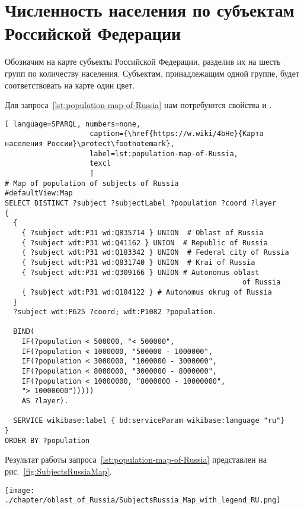 \section{Численность населения по субъектам Российской Федерации}

Обозначим на карте субъекты Российской Федерации, 
разделив их на шесть групп по количеству населения. 
Субъектам, принадлежащим одной группе, будет соответствовать на карте один цвет.

Для запроса~\ref{lst:population-map-of-Russia} нам потребуются свойства  
и .

\begin{lstlisting}[ language=SPARQL, numbers=none,
                    caption={\href{https://w.wiki/4bHe}{Карта населения России}\protect\footnotemark},
                    label=lst:population-map-of-Russia,
                    texcl 
                    ]
# Map of population of subjects of Russia
#defaultView:Map
SELECT DISTINCT ?subject ?subjectLabel ?population ?coord ?layer
{
  {
    { ?subject wdt:P31 wd:Q835714 } UNION  # Oblast of Russia
    { ?subject wdt:P31 wd:Q41162 } UNION  # Republic of Russia
    { ?subject wdt:P31 wd:Q183342 } UNION  # Federal city of Russia
    { ?subject wdt:P31 wd:Q831740 } UNION  # Krai of Russia
    { ?subject wdt:P31 wd:Q309166 } UNION # Autonomus oblast 
                                                        of Russia
    { ?subject wdt:P31 wd:Q184122 } # Autonomus okrug of Russia
  }   
  ?subject wdt:P625 ?coord; wdt:P1082 ?population.
  
  BIND(
    IF(?population < 500000, "< 500000",
    IF(?population < 1000000, "500000 - 1000000",
    IF(?population < 3000000, "1000000 - 3000000",
    IF(?population < 8000000, "3000000 - 8000000",
    IF(?population < 10000000, "8000000 - 10000000",
    "> 10000000")))))
    AS ?layer).
  
  SERVICE wikibase:label { bd:serviceParam wikibase:language "ru"}
}
ORDER BY ?population
\end{lstlisting}%

Результат работы запроса~\ref{lst:population-map-of-Russia} представлен на рис.~\ref{fig:SubjectsRussiaMap}.

\begin{fullwidth}
\begin{figure*}[h]
	\texttt{[image: ./chapter/oblast\_of\_Russia/SubjectsRussia\_Map\_with\_legend\_RU.png]}
	\caption[Карта численности населения по субъектам России, 2021 год.]{Карта численности населения по субъектам России, 2021 год. Субъекты разделёны на шесть групп по количеству населения и отмечены разными цветами в зависимости от группы, в которую субъект входит. Карта построена с~помощью запроса~\protect\ref{lst:population-map-of-Russia}.}%
      \label{fig:SubjectsRussiaMap}%
\end{figure*} 
\end{fullwidth}

